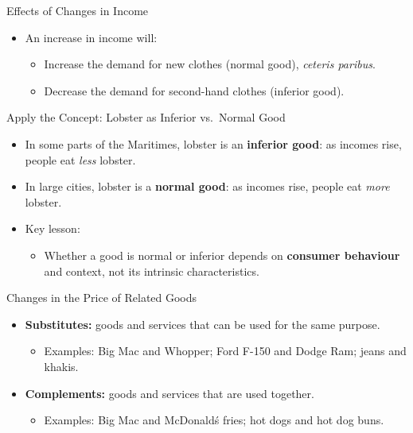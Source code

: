 \documentclass[aspectratio=169]{beamer}
\begin{document}
\begin{frame}{Effects of Changes in Income}
\transfade
\begin{itemize}
  \item An increase in income will:
  \begin{itemize}
    \item Increase the demand for new clothes (normal good), \emph{ceteris paribus}.
    \item Decrease the demand for second-hand clothes (inferior good).
  \end{itemize}
\end{itemize}
\end{frame}

\begin{frame}{Apply the Concept: Lobster as Inferior vs.\ Normal Good}
\transfade
\small
\begin{itemize}
  \item In some parts of the Maritimes, lobster is an \textbf{inferior good}: as incomes rise, people eat \emph{less} lobster.
  \item In large cities, lobster is a \textbf{normal good}: as incomes rise, people eat \emph{more} lobster.
  \item Key lesson:
  \begin{itemize}
    \item Whether a good is normal or inferior depends on \textbf{consumer behaviour} and context, not its intrinsic characteristics.
  \end{itemize}
\end{itemize}
\end{frame}

\begin{frame}{Changes in the Price of Related Goods}
\transfade
\begin{itemize}
  \item \textbf{Substitutes:} goods and services that can be used for the same purpose.
  \begin{itemize}
    \item Examples: Big Mac and Whopper; Ford F-150 and Dodge Ram; jeans and khakis.
  \end{itemize}
  \item \textbf{Complements:} goods and services that are used together.
  \begin{itemize}
    \item Examples: Big Mac and McDonald\'s fries; hot dogs and hot dog buns.
  \end{itemize}
\end{itemize}
\end{frame}
\end{document}
